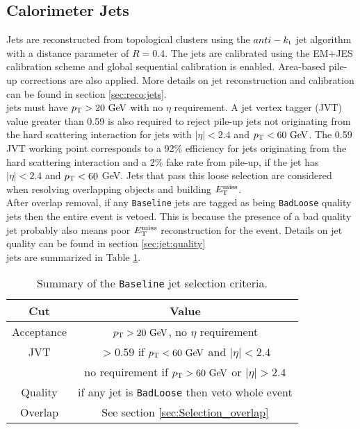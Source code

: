 \subsection{Calorimeter Jets}
\label{sec:def:jets}

\indent Jets are reconstructed from topological clusters using the $anti-k_{\rm{t}}$ jet algorithm\cite{jetReco7TeV} with a distance parameter of $R = 0.4$.  The jets are calibrated using the EM+JES calibration scheme and global sequential calibration is enabled. Area-based pile-up corrections are also applied. More details on jet reconstruction and calibration can be found in section \ref{sec:reco:jets}. \\
  
 jets must have $\pT > 20\gev$ with no $\eta$ requirement. A jet vertex tagger (JVT) value greater than 0.59 is also required to reject pile-up jets not originating from the hard scattering interaction for jets with $|\eta|<2.4$ and $\pt < 60 \gev$.  The 0.59 JVT working point corresponds to a 92\% efficiency for jets originating from the hard scattering interaction and a 2\% fake rate from pile-up, if the jet has $|\eta|<2.4$ and $p_{\mathrm{T}}<60$ GeV. Jets that pass this loose selection are considered when resolving overlapping objects and building $E_{\mathrm{T}}^{\mathrm{miss}}$.  \\

\indent After overlap removal, if any {\tt Baseline} jets are tagged as being {\tt BadLoose} quality jets then the entire event is vetoed.  This is because the presence of a bad quality jet probably also means poor $E_{\mathrm{T}}^{\mathrm{miss}}$ reconstruction for the event.  Details on jet quality can be found in section \ref{sec:jet:quality} \\

 jets are summarized in Table \ref{tb:jets:baseline}. \\

\begin{table}[h!]
  \caption{Summary of the {\tt Baseline} jet selection criteria.} 
  \label{tb:jets:baseline}
  \begin{center}
    \begin{tabular}{c|c} \hline \hline
      Cut & Value \\ \hline \hline
      Acceptance & $\pT > 20\gev$, no $\eta$ requirement \\ \hline
      JVT & $> 0.59$ if $\pt < 60 \gev$ and $|\eta| < 2.4$ \\
             & no requirement if $\pt > 60 \gev$ or $|\eta| > 2.4$ \\ \hline
      Quality & if any jet is {\tt BadLoose} then veto whole event  \\ \hline
      Overlap & See section \ref{sec:Selection_overlap} \\ \hline
      \hline
    \end{tabular}
  \end{center}
\end{table}%

